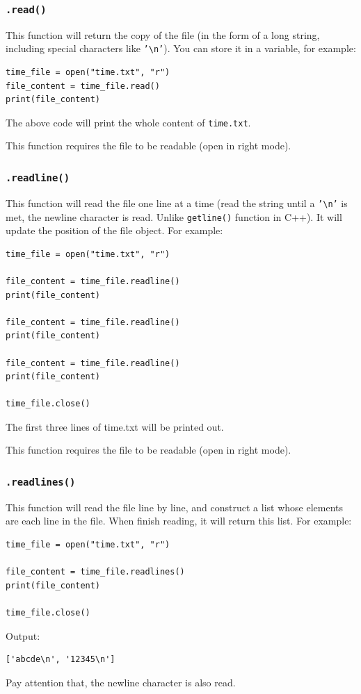 \documentclass[12pt]{book}
\begin{document}
\subsubsection{\texttt{.read()}}
\label{sec:org333291d}
This function will return the copy of the file (in the form of a long string, including special characters like \texttt{'\textbackslash{}n'}). You can store it in a variable, for example:
\begin{verbatim}
time_file = open("time.txt", "r")
file_content = time_file.read()
print(file_content)
\end{verbatim}
The above code will print the whole content of \texttt{time.txt}.

This function requires the file to be readable (open in right mode).
\subsubsection{\texttt{.readline()}}
\label{sec:org33c60d7}
This function will read the file one line at a time (read the string until a \texttt{'\textbackslash{}n'} is met, the newline character is read. Unlike \texttt{getline()} function in C++). It will update the position of the file object. For example:
\begin{verbatim}
time_file = open("time.txt", "r")

file_content = time_file.readline()
print(file_content)

file_content = time_file.readline()
print(file_content)

file_content = time_file.readline()
print(file_content)

time_file.close()
\end{verbatim}
The first three lines of time.txt will be printed out.

This function requires the file to be readable (open in right mode).
\subsubsection{\texttt{.readlines()}}
\label{sec:org5203230}
This function will read the file line by line, and construct a list whose elements are each line in the file. When finish reading, it will return this list. For example:
\begin{verbatim}
time_file = open("time.txt", "r")

file_content = time_file.readlines()
print(file_content)

time_file.close()
\end{verbatim}
Output:
\begin{verbatim}
['abcde\n', '12345\n']
\end{verbatim}
Pay attention that, the newline character is also read.
\end{document}
